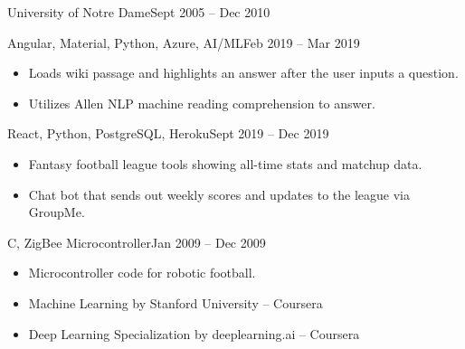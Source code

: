  {University of Notre Dame}{Sept 2005 -- Dec 2010 \hspace{1 cm}}{}

\smallskip
{}

\smallskip
{}
{Angular, Material, Python, Azure, AI/ML}{Feb 2019 -- Mar 2019}{}
\begin{itemize}
\item Loads wiki passage and highlights an answer after the user inputs a question.
\item Utilizes Allen NLP machine reading comprehension to answer.
\end{itemize}

\divider

{React, Python, PostgreSQL, Heroku}{Sept 2019 -- Dec 2019}{}
\begin{itemize}
\item  Fantasy football league tools showing all-time stats and matchup data.
\item  Chat bot that sends out weekly scores and updates to the league via GroupMe.
\end{itemize}

\divider

{C, ZigBee Microcontroller}{Jan 2009 -- Dec 2009}{}
\begin{itemize}
\item  Microcontroller code for robotic football.
\end{itemize}




\begin{itemize}
    \item Machine Learning by Stanford University -- Coursera
    \item Deep Learning Specialization by deeplearning.ai -- Coursera
\end{itemize}
